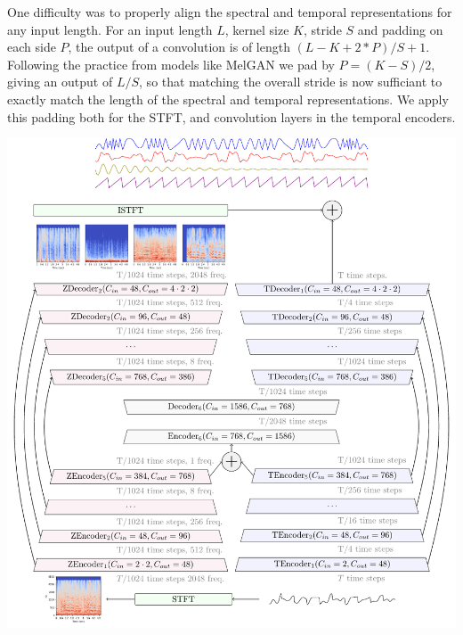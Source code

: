 \documentclass[10pt,a4paper,onecolumn]{article}
\let\origfigure\figure
\let\endorigfigure\endfigure
\renewenvironment{figure}[1][2] {
    \expandafter\origfigure\expandafter[H]
} {
    \endorigfigure
}
\begin{document}
One difficulty was to properly align the spectral and temporal
representations for any input length. For an input length \(L\), kernel
size \(K\), stride \(S\) and padding on each side \(P\), the output of a
convolution is of length \((L - K + 2 * P) / S + 1\). Following the
practice from models like MelGAN \citep{melgan} we pad by
\(P = (K - S) / 2\), giving an output of \(L / S\), so that matching the
overall stride is now sufficiant to exactly match the length of the
spectral and temporal representations. We apply this padding both for
the STFT, and convolution layers in the temporal encoders.

\begin{figure}
\hypertarget{fig:hyb}{%
\centering
\includegraphics{figures/hybrid.pdf}
\caption{Hybrid Demucs architecture. The input waveform is processed
both through a temporal encoder, and first through the STFT followed by
a spectral encoder. The two representations are summed when their
dimensions align. The decoder is built symmetrically. The output
spectrogram go through the ISTFT and is summed with the waveform
outputs, giving the final model output. The \(\mathrm{Z}\) prefix is
used for spectral layers, and \(\mathrm{T}\) prefix for the temporal
ones.}\label{fig:hyb}
}
\end{figure}
\end{document}
